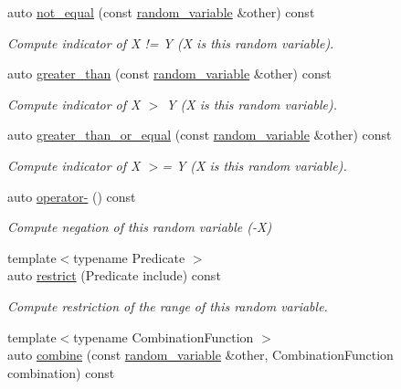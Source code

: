 \begin{DoxyCompactItemize}
auto \mbox{\hyperlink{classdice_1_1random__variable_aeeabefcda0c3599eba97b98fab245021}{not\+\_\+equal}} (const \mbox{\hyperlink{classdice_1_1random__variable}{random\+\_\+variable}} \&other) const
\begin{DoxyCompactList}\small\item\em Compute indicator of X != Y (X is this random variable). \end{DoxyCompactList}\item 
auto \mbox{\hyperlink{classdice_1_1random__variable_abeb43cf9343eb0f26418b71f04a3b350}{greater\+\_\+than}} (const \mbox{\hyperlink{classdice_1_1random__variable}{random\+\_\+variable}} \&other) const
\begin{DoxyCompactList}\small\item\em Compute indicator of X $>$ Y (X is this random variable). \end{DoxyCompactList}\item 
auto \mbox{\hyperlink{classdice_1_1random__variable_a067075bcd32f952f4eadcd7a888038b5}{greater\+\_\+than\+\_\+or\+\_\+equal}} (const \mbox{\hyperlink{classdice_1_1random__variable}{random\+\_\+variable}} \&other) const
\begin{DoxyCompactList}\small\item\em Compute indicator of X $>$= Y (X is this random variable). \end{DoxyCompactList}\item 
auto \mbox{\hyperlink{classdice_1_1random__variable_a5900675092ca3ca0ea387628ed64624f}{operator-\/}} () const
\begin{DoxyCompactList}\small\item\em Compute negation of this random variable (-\/X) \end{DoxyCompactList}\item 
{\footnotesize template$<$typename Predicate $>$ }\\auto \mbox{\hyperlink{classdice_1_1random__variable_a79723edbb8e79a914f7b5ea37a13ed9a}{restrict}} (Predicate include) const
\begin{DoxyCompactList}\small\item\em Compute restriction of the range of this random variable. \end{DoxyCompactList}\item 
{\footnotesize template$<$typename Combination\+Function $>$ }\\auto \mbox{\hyperlink{classdice_1_1random__variable_a6aa92a82cfccdefe467410ec8e0d4dc7}{combine}} (const \mbox{\hyperlink{classdice_1_1random__variable}{random\+\_\+variable}} \&other, Combination\+Function combination) const

\end{DoxyCompactItemize}
